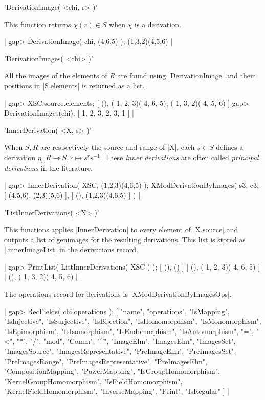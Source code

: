 'DerivationImage( <chi, r> )'

This function returns $\chi(r) \in S$ when $\chi$ is a derivation.

|    gap> DerivationImage( chi, (4,6,5) );
    (1,3,2)(4,5,6)  |

%

'DerivationImages( <chi> )'

All   the  images   of  the   elements     of  $R$ are  found    using
|DerivationImage| and their positions in |S.elements| is returned as a
list.

|    gap> XSC.source.elements;
    [ (), ( 1, 2, 3)( 4, 6, 5), ( 1, 3, 2)( 4, 5, 6) ]
    gap> DerivationImages(chi);
    [ 1, 2, 3, 2, 3, 1 ]  |

%

'InnerDerivation( <X, s> )'

When $S,R$ are respectively the source  and range of  |X|, each $s \in
S$ defines a derivation $\eta_s  \: R  \to S,  r \mapsto s^r  s^{-1}$.
These {\em inner   derivations}   are  often  called  {\em   principal
derivations} in the literature.

|    gap> InnerDerivation( XSC, (1,2,3)(4,6,5) );
    XModDerivationByImages( s3, c3, [ (4,5,6), (2,3)(5,6) ],
       [ (), (1,2,3)(4,6,5) ] )  |

%

'ListInnerDerivations( <X> )'
 
This    functions  applies |InnerDerivation|     to every  element  of
|X.source| and outputs    a   list of  genimages  for   the  resulting
derivations.   This   list is   stored   as |.innerImageList|   in the
derivations record.

|    gap> PrintList( ListInnerDerivations( XSC ) );
    [ (), () ]
    [ (), ( 1, 2, 3)( 4, 6, 5) ]
    [ (), ( 1, 3, 2)( 4, 5, 6) ]  |

%

The operations record for derivations is  |XModDerivationByImagesOps|.

|    gap> RecFields( chi.operations );
    [ "name", "operations", "IsMapping", "IsInjective", "IsSurjective", 
      "IsBijection", "IsHomomorphism", "IsMonomorphism", "IsEpimorphism", 
      "IsIsomorphism", "IsEndomorphism", "IsAutomorphism", "=", "<", "*",
      "/", "mod", "Comm", "^", "ImageElm", "ImagesElm", "ImagesSet",
      "ImagesSource", "ImagesRepresentative", "PreImageElm",
      "PreImagesSet", "PreImagesRange", "PreImagesRepresentative",
      "PreImagesElm", "CompositionMapping", "PowerMapping",
      "IsGroupHomomorphism", "KernelGroupHomomorphism",
      "IsFieldHomomorphism", "KernelFieldHomomorphism",
      "InverseMapping", "Print", "IsRegular" ]  |

